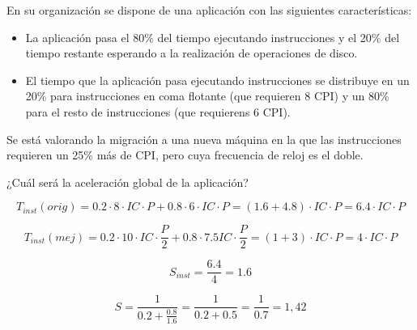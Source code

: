 \begin{acexercise}\end{acexercise}

En su organización se dispone de una aplicación con las siguientes características:

\begin{itemize}

\item La aplicación pasa el 80\% del tiempo ejecutando instrucciones y el 20\%
del tiempo restante esperando a la realización de operaciones de disco.

\item El tiempo que la aplicación pasa ejecutando instrucciones se distribuye
en un 20\% para instrucciones en coma flotante (que requieren 8 CPI) y un 80\%
para el resto de instrucciones (que requierens 6 CPI).

\end{itemize}

Se está valorando la migración a una nueva máquina en la que las instrucciones
requieren un 25\% más de CPI, pero cuya frecuencia de reloj es el doble.

¿Cuál será la aceleración global de la aplicación?


\begin{acsolution}\end{acsolution}

\[ 
T_{inst}(orig) = 
0.2 \cdot 8 \cdot IC \cdot P+ 0.8 \cdot 6 \cdot IC \cdot P = 
(1.6 + 4.8) \cdot IC \cdot P = 
6.4 \cdot IC \cdot P 
\]

\[ 
T_{inst}(mej) = 
0.2 \cdot 10 \cdot IC \cdot \frac{P}{2} + 0.8 \cdot 7.5 IC \cdot \frac{P}{2} = 
(1 + 3) \cdot IC \cdot P = 
4 \cdot IC \cdot P 
\]

\[ 
S_{inst} = 
\frac{6.4}{4} = 
1.6 
\]

\[ 
S = 
\frac{1}{0.2 + \frac{0.8}{1.6}} = 
\frac{1}{0.2 + 0.5} = 
\frac{1}{0.7} =1,42 
\]

